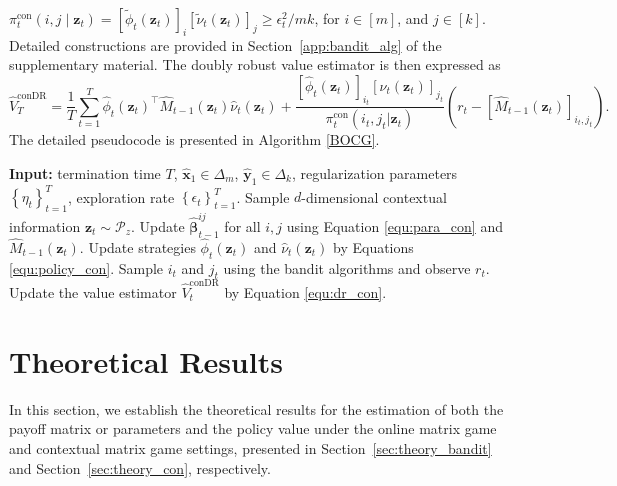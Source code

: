 \documentclass[12pt]{article}
\begin{document}
$\pi_t^{\mathrm{con}}(i,j\mid \bm z_t)
=
[\widetilde{\phi}_t(\bm z_t)]_i
[\widetilde{\nu}_t(\bm z_t)]_j
\geq
{\epsilon_t^2}/{mk}$, for 
$i\in[m]$, and $j\in[k]$.  Detailed constructions are provided in Section~\ref{app:bandit_alg} of the supplementary material.
The doubly robust value estimator is then expressed as
\begin{equation}
\label{equ:dr_con}
    \widehat{V}_T^{\text{conDR}} = \frac{1}{T}\sum_{t=1}^T \widehat{\phi}_t(\bm{z}_t)^\top \widehat{M}_{t-1}(\bm{z}_t)\widehat{\nu}_t(\bm{z}_t) + \frac{[\widehat{\phi}_t(\bm{z}_t)]_{i_t}[\widehat{\nu}_t(\bm{z}_t)]_{j_t}}{{\pi}_t^{\mathrm{con}}(i_t,j_t \vert \bm{z}_t)}(r_t - [\widehat{M}_{t-1}(\bm{z}_t)]_{i_t,j_t}).
\end{equation}
The detailed pseudocode is presented in Algorithm \ref{BOCG}.

\begin{algorithm}
\caption{Online Contextual Matrix Games with Bandit Feedback}
\label{BOCG}
\begin{algorithmic}[1]
\State \textbf{Input:} termination time $T$, \(\widehat{\bm{x}}_1 \in \Delta_{m} \), \(\widehat{\bm{y}}_1 \in \Delta_{k}\), regularization parameters $\left\{\eta_t \right\}_{t=1}^T$, exploration rate $\left\{\epsilon_t \right\}_{t=1}^T$.
    \State Sample $d$-dimensional contextual information $\bm{z}_t \sim \mathcal{P}_z$.
    \State Update $\widehat{\bm{\beta}}_{t-1}^{ij}$ for all $i,j$ using Equation \eqref{equ:para_con} and $\widehat{M}_{t-1}(\bm{z}_t)$.
    \State Update strategies $\widehat{\phi}_t(\bm{z}_t)$ and $\widehat{\nu}_t(\bm{z}_t)$ by Equations \eqref{equ:policy_con}.
    \State Sample $i_t$ and $j_t$ using the bandit algorithms and observe $r_t$.
    \State Update the value estimator $\widehat{V}_t^{\text{conDR}}$ by Equation \eqref{equ:dr_con}.
\EndFor
\end{algorithmic}
\end{algorithm}


\section{Theoretical Results}
\label{sec:theory}

In this section, we establish the theoretical results for the estimation of both the payoff matrix or parameters and the policy value under the online matrix game and contextual matrix game settings, presented in Section~\ref{sec:theory_bandit} and Section~\ref{sec:theory_con}, respectively. 
\end{document}
